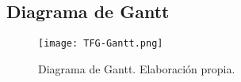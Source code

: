\begin{landscape}
\subsection{Diagrama de Gantt}

\graphicspath{ {Planificación temporal/Diagrama de Gantt/figures/} }

\begin{figure}[!ht]
    \centering
    \texttt{[image: TFG-Gantt.png]}
    \caption{Diagrama de Gantt. Elaboración propia.}
    \label{fig:gantt}
\end{figure}

\end{landscape}